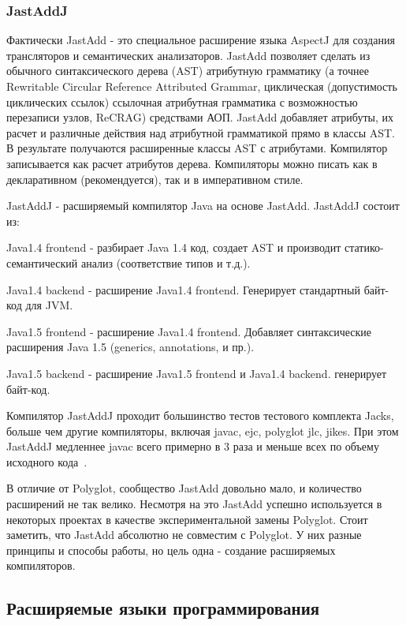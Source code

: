\documentclass[a4paper,12pt]{article}
\begin{document}
\subsubsection{JastAddJ}
Фактически JastAdd - это специальное расширение языка AspectJ для создания
трансляторов и семантических анализаторов. JastAdd позволяет сделать из
обычного синтаксического дерева (AST) атрибутную грамматику (а точнее
Rewritable Circular Reference Attributed Grammar, циклическая (допустимость
циклических ссылок) ссылочная атрибутная грамматика с возможностью перезаписи
узлов, ReCRAG) средствами АОП. JastAdd добавляет атрибуты, их расчет и
различные действия над атрибутной грамматикой прямо в классы AST. В результате
получаются расширенные классы AST с атрибутами. Компилятор записывается как
расчет атрибутов дерева. Компиляторы можно писать как в декларативном
(рекомендуется), так и в императивном стиле.

JastAddJ - расширяемый компилятор Java на основе JastAdd.
JastAddJ состоит из:

Java1.4 frontend - разбирает Java 1.4 код, создает AST и производит
статико-семантический анализ (соответствие типов и т.д.).

Java1.4 backend - расширение Java1.4 frontend. Генерирует стандартный байт-код
для JVM.

Java1.5 frontend - расширение Java1.4 frontend. Добавляет синтаксические
расширения Java 1.5 (generics, annotations, и пр.).

Java1.5 backend - расширение Java1.5 frontend и Java1.4 backend. генерирует
байт-код.

Компилятор JastAddJ проходит большинство тестов тестового комплекта Jacks,
больше чем другие компиляторы, включая javac, ejc, polyglot jlc, jikes. При
этом JastAddJ медленнее javac всего примерно в 3 раза и меньше всех по объему
исходного кода~\cite{JastAddJ}.

В отличие от Polyglot, сообщество JastAdd довольно мало, и количество
расширений не так велико. Несмотря на это JastAdd успешно используется в
некоторых проектах в качестве экспериментальной замены Polyglot. Стоит
заметить, что JastAdd абсолютно не совместим с Polyglot. У них разные принципы
и способы работы, но цель одна - создание расширяемых компиляторов.

\subsection{Расширяемые языки программирования}
\end{document}
